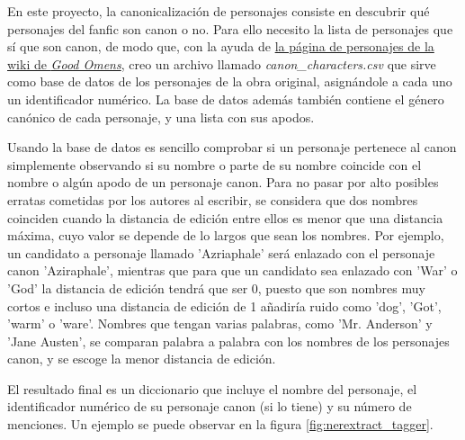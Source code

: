 \documentclass{pre-tfg}
\begin{document}
En este proyecto, la canonicalización de personajes consiste en descubrir qué personajes del fanfic son canon o no. Para ello necesito la lista de personajes que sí que son canon, de modo que, con la ayuda de \href{https://goodomens.fandom.com/wiki/Category:Characters}{la página de personajes de la wiki de \textit{Good Omens}}, creo un archivo llamado \textit{canon\_characters.csv} que sirve como base de datos de los personajes de la obra original, asignándole a cada uno un identificador numérico. La base de datos además también contiene el género canónico de cada personaje, y una lista con sus apodos.

Usando la base de datos es sencillo comprobar si un personaje pertenece al canon simplemente observando si su nombre o parte de su nombre coincide con el nombre o algún apodo de un personaje canon. Para no pasar por alto posibles erratas cometidas por los autores al escribir, se considera que dos nombres coinciden cuando la distancia de edición\cite{levenshtein_1966} entre ellos es menor que una distancia máxima, cuyo valor se depende de lo largos que sean los nombres. Por ejemplo, un candidato a personaje llamado 'Azriaphale' será enlazado con el personaje canon 'Aziraphale', mientras que para que un candidato sea enlazado con 'War' o 'God' la distancia de edición tendrá que ser 0, puesto que son nombres muy cortos e incluso una distancia de edición de 1 añadiría ruido como 'dog', 'Got', 'warm' o 'ware'. Nombres que tengan varias palabras, como 'Mr. Anderson' y 'Jane Austen', se comparan palabra a palabra con los nombres de los personajes canon, y se escoge la menor distancia de edición.

El resultado final es un diccionario que incluye el nombre del personaje, el identificador numérico de su personaje canon (si lo tiene) y su número de menciones. Un ejemplo se puede observar en la figura \ref{fig:nerextract_tagger}.
\end{document}
